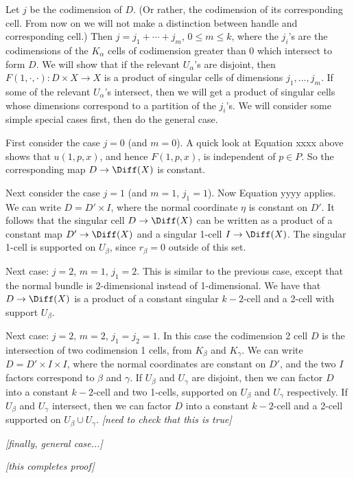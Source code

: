 \documentclass[11pt,leqno]{amsart}
\def\nn#1{{{\it \small [#1]}}}
\begin{document}
Let $j$ be the codimension of $D$.
(Or rather, the codimension of its corresponding cell.  From now on we will not make a distinction
between handle and corresponding cell.)
Then $j = j_1 + \cdots + j_m$, $0 \le m \le k$,
where the $j_i$'s are the codimensions of the $K_\alpha$
cells of codimension greater than 0 which intersect to form $D$.
We will show that
if the relevant $U_\alpha$'s are disjoint, then
$F(1, \cdot, \cdot) : D\times X \to X$
is a product of singular cells of dimensions $j_1, \ldots, j_m$.
If some of the relevant $U_\alpha$'s intersect, then we will get a product of singular
cells whose dimensions correspond to a partition of the $j_i$'s.
We will consider some simple special cases first, then do the general case.

First consider the case $j=0$ (and $m=0$).
A quick look at Equation xxxx above shows that $u(1, p, x)$, and hence $F(1, p, x)$,
is independent of $p \in P$.
So the corresponding map $D \to \Diff(X)$ is constant.

Next consider the case $j = 1$ (and $m=1$, $j_1=1$).
Now Equation yyyy applies.
We can write $D = D'\times I$, where the normal coordinate $\eta$ is constant on $D'$.
It follows that the singular cell $D \to \Diff(X)$ can be written as a product
of a constant map $D' \to \Diff(X)$ and a singular 1-cell $I \to \Diff(X)$.
The singular 1-cell is supported on $U_\beta$, since $r_\beta = 0$ outside of this set.

Next case: $j=2$, $m=1$, $j_1 = 2$.
This is similar to the previous case, except that the normal bundle is 2-dimensional instead of
1-dimensional.
We have that $D \to \Diff(X)$ is a product of a constant singular $k{-}2$-cell
and a 2-cell with support $U_\beta$.

Next case: $j=2$, $m=2$, $j_1 = j_2 = 1$.
In this case the codimension 2 cell $D$ is the intersection of two
codimension 1 cells, from $K_\beta$ and $K_\gamma$.
We can write $D = D' \times I \times I$, where the normal coordinates are constant
on $D'$, and the two $I$ factors correspond to $\beta$ and $\gamma$.
If $U_\beta$ and $U_\gamma$ are disjoint, then we can factor $D$ into a constant $k{-}2$-cell and
two 1-cells, supported on $U_\beta$ and $U_\gamma$ respectively.
If $U_\beta$ and $U_\gamma$ intersect, then we can factor $D$ into a constant $k{-}2$-cell and
a 2-cell supported on $U_\beta \cup U_\gamma$.
\nn{need to check that this is true}

\nn{finally, general case...}

\nn{this completes proof}
\end{document}
